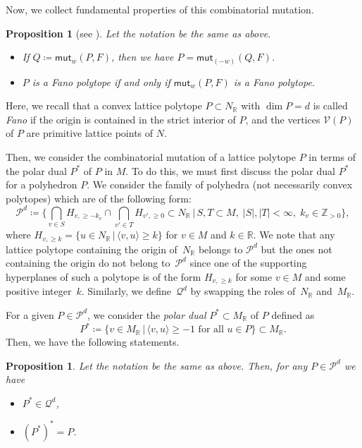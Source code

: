 \documentclass[pdftex]{sigma}%
\numberwithin{equation}{section}
\numberwithin{figure}{section}
\numberwithin{table}{section}
\newtheorem{Proposition}[Theorem]{Proposition}
 { \theoremstyle{definition}
\newtheorem{Definition}[Theorem]{Definition}
\newtheorem{Note}[Theorem]{Note}
\newtheorem{Example}[Theorem]{Example}
\newtheorem{Remark}[Theorem]{Remark}
\newtheorem{observation}[Theorem]{Observation}
\newtheorem{operation}[Theorem]{Operation}
\newtheorem{setting}[Theorem]{Setting}}
\newcommand{\ZZ}{\mathbb{Z}}
\newcommand{\RR}{\mathbb{R}}
\newcommand{\calP}{\mathcal{P}}
\newcommand{\calQ}{\mathcal{Q}}
\newcommand{\calV}{\mathcal{V}}
\newcommand{\mutation}{\mathsf{mut}}
\begin{document}
Now, we collect fundamental properties of this combinatorial mutation.

\begin{Proposition}[{see \cite[Lemma~2 and Proposition~2]{ACGK}}]\label{properties_mutation_polygon}
Let the notation be the same as above.
\begin{itemize}\itemsep=0pt
\item[\rm (1)] If $Q\coloneqq\mutation_w(P,F)$, then we have $P=\mutation_{(-w)}(Q,F)$.
\item[\rm (2)] $P$ is a Fano polytope if and only if $\mutation_w(P,F)$ is a Fano polytope.
\end{itemize}
\end{Proposition}

Here, we recall that a convex lattice polytope $P\subset N_\RR$ with $\dim P=d$ is called \emph{Fano} if the origin is contained in the strict interior of $P$,
and the vertices $\calV(P)$ of $P$ are primitive lattice points of $N$.

Then, we consider the combinatorial mutation of a lattice polytope $P$ in terms of the polar dual $P^*$ of $P$ in $M$.
To do this, we must first discuss the polar dual $P^*$ for a polyhedron $P$.
We consider the family of polyhedra (not necessarily convex polytopes) which are of the following form:
\begin{displaymath}
\calP^d \coloneqq \bigg\{ \bigcap_{v \in S} H_{v,\geq -k_v} \cap \bigcap_{v' \in T}H_{v',\geq 0} \subset N_\RR \,|\, S,T \subset M, \; |S|, |T| < \infty, \; k_v \in \ZZ_{>0} \bigg\},
\end{displaymath}
where $H_{v,\geq k}=\{u \in N_\RR \,|\, \langle v,u \rangle \geq k\}$ for $v \in M$ and $k \in \RR$.
We note that any lattice polytope containing the origin of~$N_\RR$ belongs to $\calP^d$ but the ones not containing the origin do not belong to~$\calP^d$
since one of the supporting hyperplanes of such a polytope is of the form $H_{v, \geq k}$ for some $v \in M$ and some positive integer~$k$.
Similarly, we define~$\calQ^d$ by swapping the roles of~$N_\RR$ and~$M_\RR$.

For a given $P \in \calP^d$, we consider the \emph{polar dual} $P^* \subset M_\RR$ of $P$ defined as
\begin{displaymath}
P^* \coloneqq \{v \in M_\RR\,|\,\langle v,u\rangle\ge-1 \text{ for all } u\in P\}\subset M_\RR.
\end{displaymath}
Then, we have the following statements.

\begin{Proposition}\label{prop_dual_polytope}
Let the notation be the same as above. Then, for any $P \in \calP^d$ we have
\begin{itemize}\itemsep=0pt
\item[$(i)$] $P^* \in \calQ^d$,
\item[$(ii)$] $(P^*)^*=P$.
\end{itemize}
\end{Proposition}
\end{document}
